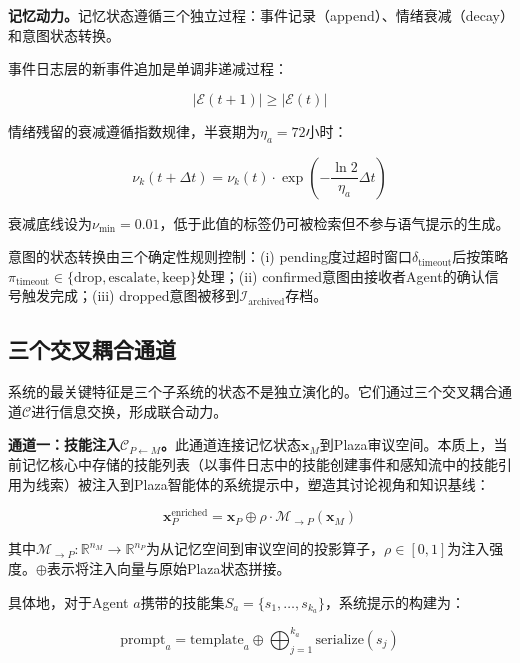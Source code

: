 \documentclass[twocolumn,10.5pt]{ctexart}
\def\R{\mathbb{R}}
\def\cE{\mathcal{E}}
\def\cI{\mathcal{I}}
\begin{document}
\textbf{记忆动力。}记忆状态遵循三个独立过程：事件记录（append）、情绪衰减（decay）和意图状态转换。

事件日志层的新事件追加是单调非递减过程：

\begin{equation}
|\cE(t+1)| \geq |\cE(t)|
\label{eq:log_growth}
\end{equation}

情绪残留的衰减遵循指数规律，半衰期为$\eta_a = 72$小时：

\begin{equation}
\nu_k(t+\Delta t) = \nu_k(t) \cdot \exp\left(-\frac{\ln 2}{\eta_a} \Delta t\right)
\label{eq:affect_decay}
\end{equation}

衰减底线设为$\nu_{\min} = 0.01$，低于此值的标签仍可被检索但不参与语气提示的生成。

意图的状态转换由三个确定性规则控制：(i) pending度过超时窗口$\delta_{\text{timeout}}$后按策略$\pi_{\text{timeout}} \in \{\mathrm{drop}, \mathrm{escalate}, \mathrm{keep}\}$处理；(ii) confirmed意图由接收者Agent的确认信号触发完成；(iii) dropped意图被移到$\cI_{\text{archived}}$存档。

\subsection{三个交叉耦合通道}

系统的最关键特征是三个子系统的状态不是独立演化的。它们通过三个交叉耦合通道$\mathcal{C}$进行信息交换，形成联合动力。

\textbf{通道一：技能注入$\mathcal{C}_{P \leftarrow M}$。}此通道连接记忆状态$\mathbf{x}_M$到Plaza审议空间。本质上，当前记忆核心中存储的技能列表（以事件日志中的技能创建事件和感知流中的技能引用为线索）被注入到Plaza智能体的系统提示中，塑造其讨论视角和知识基线：

\begin{equation}
\mathbf{x}_P^{\text{enriched}} = \mathbf{x}_P \oplus \rho \cdot \mathcal{M}_{\to P}(\mathbf{x}_M)
\label{eq:injection}
\end{equation}

其中$\mathcal{M}_{\to P}: \R^{n_M} \to \R^{n_P}$为从记忆空间到审议空间的投影算子，$\rho \in [0,1]$为注入强度。$\oplus$表示将注入向量与原始Plaza状态拼接。

具体地，对于Agent $a$携带的技能集$S_a = \{s_1, \ldots, s_{k_a}\}$，系统提示的构建为：

\begin{equation}
\text{prompt}_a = \text{template}_a \oplus \bigoplus_{j=1}^{k_a} \text{serialize}(s_j)
\label{eq:prompt_injection}
\end{equation}
\end{document}
